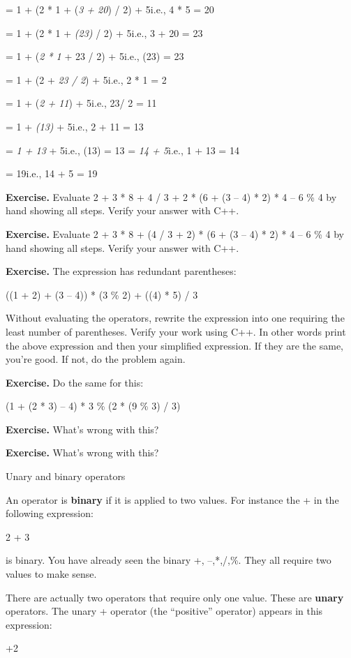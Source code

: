 \documentclass[
]{article}
\begin{document}
= 1 + (2 * 1 + (\emph{3 + 20}) / 2) + 5i.e., 4 * 5 = 20

= 1 + (2 * 1 + \emph{(23)} / 2) + 5i.e., 3 + 20 = 23

= 1 + (\emph{2 * 1} + 23 / 2) + 5i.e., (23) = 23

= 1 + (2 + \emph{23 / 2}) + 5i.e., 2 * 1 = 2

= 1 + (\emph{2 + 11}) + 5i.e., 23/ 2 = 11

= 1 + \emph{(13)} + 5i.e., 2 + 11 = 13

= \emph{1 + 13} + 5i.e., (13) = 13\textbf{\hfill\break
}= \emph{14 + 5}i.e., 1 + 13 = 14

\textbf{}= 19i.e., 14 + 5 = 19

\textbf{Exercise.} Evaluate 2 + 3 * 8 + 4 / 3 + 2 * (6 + (3 -- 4) * 2) *
4 -- 6 \% 4 by hand showing all steps. Verify your answer with C++.

\textbf{Exercise.} Evaluate 2 + 3 * 8 + (4 / 3 + 2) * (6 + (3 -- 4) * 2)
* 4 -- 6 \% 4 by hand showing all steps. Verify your answer with C++.

\textbf{Exercise.} The expression has redundant parentheses:

((1 + 2) + (3 -- 4)) * (3 \% 2) + ((4) * 5) / 3

Without evaluating the operators, rewrite the expression into one
requiring the least number of parentheses. Verify your work using C++.
In other words print the above expression and then your simplified
expression. If they are the same, you're good. If not, do the problem
again.

\textbf{Exercise.} Do the same for this:

(1 + (2 * 3) -- 4) * 3 \% (2 * (9 \% 3) / 3)

\textbf{Exercise.} What's wrong with this?

\textbf{Exercise.} What's wrong with this?

Unary and binary operators

An operator is \textbf{binary} if it is applied to two values. For
instance the + in the following expression:

2 + 3

is binary. You have already seen the binary +, --,*,/,\%. They all
require two values to make sense.

There are actually two operators that require only one value. These are
\textbf{unary} operators. The unary + operator (the ``positive''
operator) appears in this expression:

+2
\end{document}
